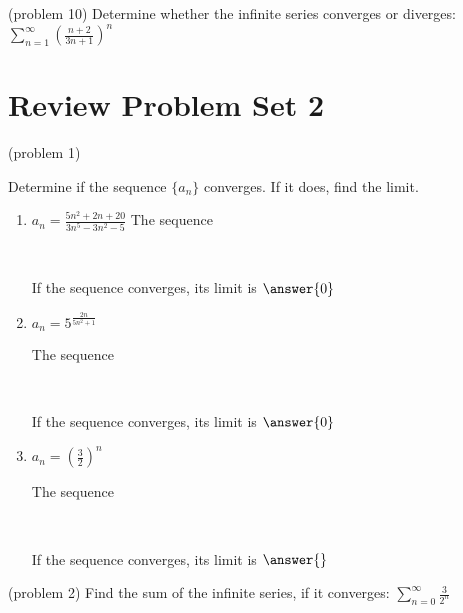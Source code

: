 \documentclass[handout]{ximera}
\begin{document}
\begin{problem}(problem 10)
Determine whether the infinite series converges or diverges: $\displaystyle \sum_{n=1}^\infty \left(\frac{n+ 2}{3n+1}\right)^n$

\end{problem}



\section{Review Problem Set 2}


\begin{problem}(problem 1)

Determine if the sequence $\{a_n\}$ converges.  If it does, find the limit.

\begin{enumerate}

\item $a_n = \frac{5n^2 + 2n + 20}{3n^5 - 3n^2 - 5}$
The sequence 
\begin{multipleChoice}
\\
\end{multipleChoice}

If the sequence converges, its limit is $\answer{0}$

\item $a_n = 5^\frac{2n}{5n^2+1}$

The sequence 
\begin{multipleChoice}
\\
\end{multipleChoice}

If the sequence converges, its limit is $\answer{0}$

\item $a_n = \left(\frac{3}{2}\right)^n$

The sequence 
\begin{multipleChoice}
\\
\end{multipleChoice}

If the sequence converges, its limit is $\answer{}$

\end{enumerate}

\end{problem}


\begin{problem}(problem 2)
Find the sum of the infinite series, if it converges: $\displaystyle \sum_{n=0}^\infty \frac{3}{2^n}$

\end{problem}
\end{document}

